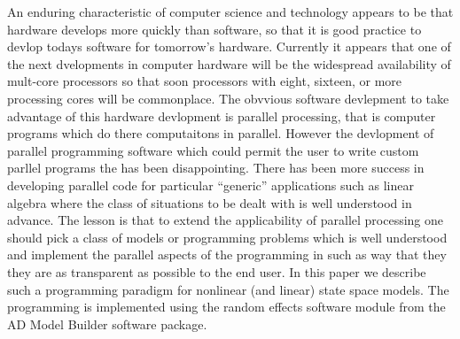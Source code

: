 %
%

\def\wha{\widehat\alpha}
\def\wht{\widehat\theta}
\def\Nipjp{N_{i+1,j+1}}
\def\Nipm{N_{i+1,m}}
\def\Nij{N_{ij}}
\def\nij{n_{ij}}
\def\Ei{E_i}
\def\Nio{N_{i1}}
\def\Nim{N_{im}}
\def\Nnpj{N_{n+1,j}}
\def\nnpj{n_{n+1,j}}
\def\Nimm{N_{i,m-1}}
\def\Zij{Z_{ij}}
\def\Fij{F_{ij}}
\def\Zim{Z_{im}}
\def\Zimm{Z_{i,m-1}}
\def\qip{q_{i+1}}
\def\qi{q_i}
\def\ui{u_i}
\def\sj{s_j}
\def\deltai{\delta_i}
\def\di{d_i}
\def\epsij{\epsilon_{ij}}
\def\kappaij{\kappa_{ij}}
\def\epst{\epsilon_t}
\def\at{\alpha_t}
\def\atp{\alpha_{t+1}}
\def\gami{\gam_i}
\def\lami{\lambda_i}
\def\etai{\eta_i}
\def\Cijobs{C^{obs}_{ij}}
\def\Cij{C_{ij}}
\def\myeq{}

An enduring characteristic of computer science and technology
appears to be that hardware develops more quickly than software,
so that it is good practice to devlop todays software for tomorrow's
hardware. Currently it appears that one of the next dvelopments 
in computer hardware will be the widespread availability of mult-core processors so that soon
processors with eight, sixteen, or more processing cores will be commonplace.
The obvvious software devlepment to take advantage of this hardware devlopment 
is parallel processing, that is computer programs which do there computaitons in parallel. However the devlopment of parallel programming software 
which could permit the user to write custom parllel programs the has been 
disappointing. There has been more success in developing parallel code for
particular ``generic'' applications such as linear algebra 
where the class of situations to be dealt  with is well understood in advance.
The lesson is that to extend the applicability of parallel processing 
one should pick a class of models or programming problems which is 
well understood and implement the parallel aspects of the programming in such as
way that they they are as transparent as possible to the end user.
In this paper we describe such a programming paradigm for 
nonlinear (and linear) state space models. The programming is 
implemented using the random effects software module from
the AD Model Builder software package.

